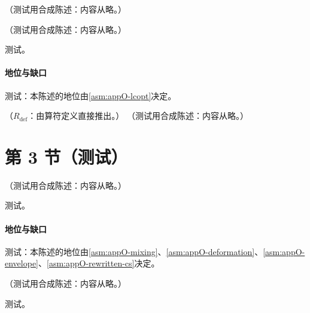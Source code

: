 \begin{remark}[每个喷注一个光锥时间]\label{rem:dy-one-time-per-jet}
（测试用合成陈述：内容从略。）
\end{remark}

\begin{lemma}\label{lem:dy-fsi}
（测试用合成陈述：内容从略。）
\end{lemma}
\begin{proofsketch}测试。\end{proofsketch}
\paragraph{地位与缺口}测试：本陈述的地位由\cref{asm:appO-lcopt}决定。

\begin{example}\label{ex:dy-future-vs-past}
（$R_{\mathrm{def}}$：由算符定义直接推出。）
（测试用合成陈述：内容从略。）
\end{example}

\section{第 3 节（测试）}\label{sec:dy-orientation}

\begin{proposition}\label{prop:dy-deformation}
（测试用合成陈述：内容从略。）
\end{proposition}
\begin{proofsketch}测试。\end{proofsketch}
\paragraph{地位与缺口}测试：本陈述的地位由\cref{asm:appO-mixing}、\cref{asm:appO-deformation}、\cref{asm:appO-envelope}、\cref{asm:appO-rewritten-cs}决定。

\begin{lemma}\label{lem:dy-soft}
（测试用合成陈述：内容从略。）
\end{lemma}
\begin{proofsketch}测试。\end{proofsketch}
